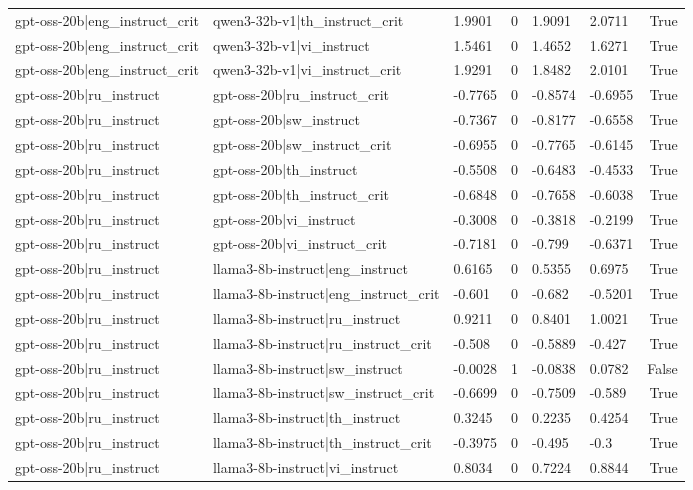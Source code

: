 \begin{table}
\begin{tabular}{llllllr}
gpt-oss-20b|eng_instruct_crit & qwen3-32b-v1|th_instruct_crit & 1.9901 & 0 & 1.9091 & 2.0711 & True \\
gpt-oss-20b|eng_instruct_crit & qwen3-32b-v1|vi_instruct & 1.5461 & 0 & 1.4652 & 1.6271 & True \\
gpt-oss-20b|eng_instruct_crit & qwen3-32b-v1|vi_instruct_crit & 1.9291 & 0 & 1.8482 & 2.0101 & True \\
gpt-oss-20b|ru_instruct & gpt-oss-20b|ru_instruct_crit & -0.7765 & 0 & -0.8574 & -0.6955 & True \\
gpt-oss-20b|ru_instruct & gpt-oss-20b|sw_instruct & -0.7367 & 0 & -0.8177 & -0.6558 & True \\
gpt-oss-20b|ru_instruct & gpt-oss-20b|sw_instruct_crit & -0.6955 & 0 & -0.7765 & -0.6145 & True \\
gpt-oss-20b|ru_instruct & gpt-oss-20b|th_instruct & -0.5508 & 0 & -0.6483 & -0.4533 & True \\
gpt-oss-20b|ru_instruct & gpt-oss-20b|th_instruct_crit & -0.6848 & 0 & -0.7658 & -0.6038 & True \\
gpt-oss-20b|ru_instruct & gpt-oss-20b|vi_instruct & -0.3008 & 0 & -0.3818 & -0.2199 & True \\
gpt-oss-20b|ru_instruct & gpt-oss-20b|vi_instruct_crit & -0.7181 & 0 & -0.799 & -0.6371 & True \\
gpt-oss-20b|ru_instruct & llama3-8b-instruct|eng_instruct & 0.6165 & 0 & 0.5355 & 0.6975 & True \\
gpt-oss-20b|ru_instruct & llama3-8b-instruct|eng_instruct_crit & -0.601 & 0 & -0.682 & -0.5201 & True \\
gpt-oss-20b|ru_instruct & llama3-8b-instruct|ru_instruct & 0.9211 & 0 & 0.8401 & 1.0021 & True \\
gpt-oss-20b|ru_instruct & llama3-8b-instruct|ru_instruct_crit & -0.508 & 0 & -0.5889 & -0.427 & True \\
gpt-oss-20b|ru_instruct & llama3-8b-instruct|sw_instruct & -0.0028 & 1 & -0.0838 & 0.0782 & False \\
gpt-oss-20b|ru_instruct & llama3-8b-instruct|sw_instruct_crit & -0.6699 & 0 & -0.7509 & -0.589 & True \\
gpt-oss-20b|ru_instruct & llama3-8b-instruct|th_instruct & 0.3245 & 0 & 0.2235 & 0.4254 & True \\
gpt-oss-20b|ru_instruct & llama3-8b-instruct|th_instruct_crit & -0.3975 & 0 & -0.495 & -0.3 & True \\
gpt-oss-20b|ru_instruct & llama3-8b-instruct|vi_instruct & 0.8034 & 0 & 0.7224 & 0.8844 & True \\

\end{tabular}
\end{table}
